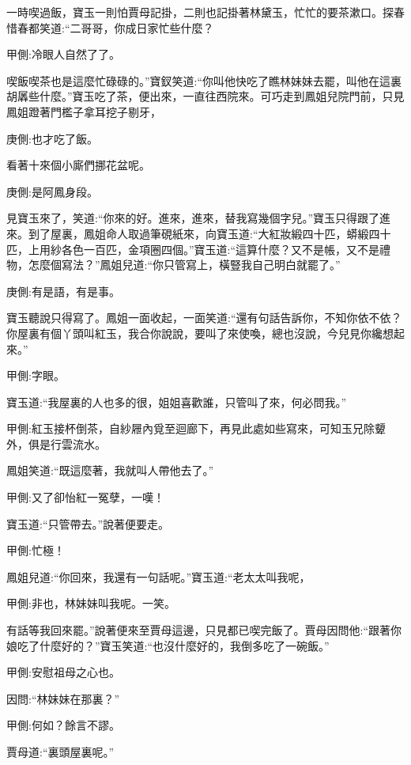 \begin{parag}
    一時喫過飯，寶玉一則怕賈母記掛，二則也記掛著林黛玉，忙忙的要茶漱口。探春惜春都笑道:“二哥哥，你成日家忙些什麼？\begin{note}甲側:冷眼人自然了了。\end{note}喫飯喫茶也是這麼忙碌碌的。”寶釵笑道:“你叫他快吃了瞧林妹妹去罷，叫他在這裏胡羼些什麼。”寶玉吃了茶，便出來，一直往西院來。可巧走到鳳姐兒院門前，只見鳳姐蹬著門檻子拿耳挖子剔牙，\begin{note}庚側:也才吃了飯。\end{note}看著十來個小廝們挪花盆呢。\begin{note}庚側:是阿鳳身段。\end{note}見寶玉來了，笑道:“你來的好。進來，進來，替我寫幾個字兒。”寶玉只得跟了進來。到了屋裏，鳳姐命人取過筆硯紙來，向寶玉道:“大紅妝緞四十匹，蟒緞四十匹，上用紗各色一百匹，金項圈四個。”寶玉道:“這算什麼？又不是帳，又不是禮物，怎麼個寫法？”鳳姐兒道:“你只管寫上，橫豎我自己明白就罷了。”\begin{note}庚側:有是語，有是事。\end{note}寶玉聽說只得寫了。鳳姐一面收起，一面笑道:“還有句話告訴你，不知你依不依？你屋裏有個丫頭叫紅玉，我合你說說，要叫了來使喚，總也沒說，今兒見你纔想起來。”\begin{note}甲側:字眼。\end{note}寶玉道:“我屋裏的人也多的很，姐姐喜歡誰，只管叫了來，何必問我。”\begin{note}甲側:紅玉接杯倒茶，自紗屜內覓至迴廊下，再見此處如些寫來，可知玉兄除顰外，俱是行雲流水。\end{note}鳳姐笑道:“既這麼著，我就叫人帶他去了。”\begin{note}甲側:又了卻怡紅一冤孽，一嘆！\end{note}寶玉道:“只管帶去。”說著便要走。\begin{note}甲側:忙極！\end{note}鳳姐兒道:“你回來，我還有一句話呢。”寶玉道:“老太太叫我呢，\begin{note}甲側:非也，林妹妹叫我呢。一笑。\end{note}有話等我回來罷。”說著便來至賈母這邊，只見都已喫完飯了。賈母因問他:“跟著你娘吃了什麼好的？”寶玉笑道:“也沒什麼好的，我倒多吃了一碗飯。”\begin{note}甲側:安慰祖母之心也。\end{note}因問:“林妹妹在那裏？”\begin{note}甲側:何如？餘言不謬。\end{note}賈母道:“裏頭屋裏呢。”
\end{parag}


